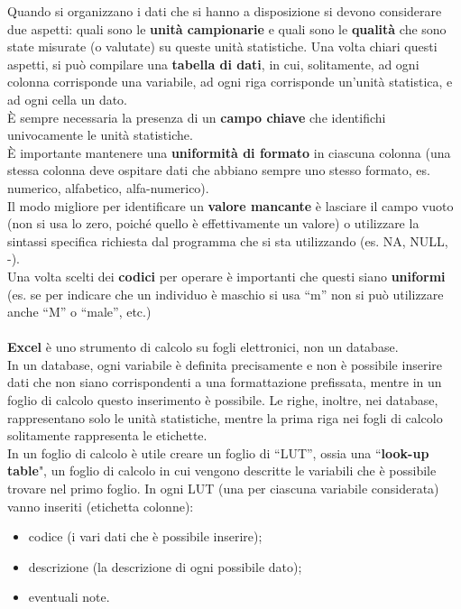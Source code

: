 \documentclass[10pt, draft]{book}
\newcommand{\tightlist}{%
\setlength{\itemsep}{1pt}\setlength{\parskip}{0pt}\setlength{\parsep}{0pt}}
\begin{document}
Quando si organizzano i dati che si hanno a disposizione si devono considerare due aspetti: quali sono le \textbf{unità campionarie} e quali sono le \textbf{qualità} che sono state misurate (o valutate) su queste unità statistiche. Una volta chiari questi aspetti, si può compilare una \textbf{tabella di dati}, in cui, solitamente, ad ogni colonna corrisponde una variabile, ad ogni riga corrisponde un'unità statistica, e ad ogni cella un dato.
\\
È sempre necessaria la presenza di un \textbf{campo chiave} che identifichi univocamente le unità statistiche.
\\
È importante mantenere una \textbf{uniformità di formato} in ciascuna colonna (una stessa colonna deve ospitare dati che abbiano sempre uno stesso formato, es. numerico, alfabetico, alfa-numerico).
\\
Il modo migliore per identificare un \textbf{valore mancante} è lasciare il campo vuoto (non si usa lo zero, poiché quello è effettivamente un valore) o utilizzare la sintassi specifica richiesta dal programma che si sta utilizzando (es. NA, NULL, -).
\\
Una volta scelti dei \textbf{codici} per operare è importanti che questi siano \textbf{uniformi} (es. se per indicare che un individuo è maschio si usa “m” non si può utilizzare anche “M” o “male”, etc.)
\\
\\
\textbf{Excel} è uno strumento di calcolo su fogli elettronici, non un database.
\\
In un database, ogni variabile è definita precisamente e non è possibile inserire dati che non siano corrispondenti a una formattazione prefissata, mentre in un foglio di calcolo questo inserimento è possibile. Le righe, inoltre, nei database, rappresentano solo le unità statistiche, mentre la prima riga nei fogli di calcolo solitamente rappresenta le etichette.
\\
In un foglio di calcolo è utile creare un foglio di “LUT”, ossia una “\textbf{look-up table}", un foglio di calcolo in cui vengono descritte le variabili che è possibile trovare nel primo foglio. In ogni LUT (una per ciascuna variabile considerata) vanno inseriti (etichetta colonne):
\begin{itemize} \tightlist
    \item codice (i vari dati che è possibile inserire);
    \item descrizione (la descrizione di ogni possibile dato);
    \item eventuali note.
\end{itemize}
\end{document}
